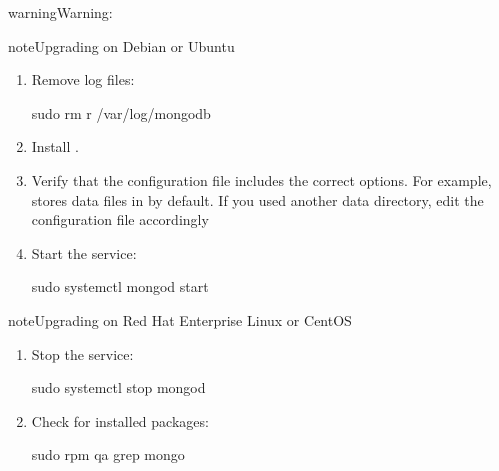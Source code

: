 \documentclass[letterpaper,10pt,english]{sphinxmanual}
\begin{document}
\begin{sphinxadmonition}{warning}{Warning:}
\begin{sphinxadmonition}{note}{Upgrading on Debian or Ubuntu}
\begin{enumerate}
\item {} 
\sphinxAtStartPar
Remove log files:

\begin{sphinxVerbatim}[commandchars=\\\{\}]
\PYGZdl{} sudo rm \PYGZhy{}r /var/log/mongodb
\end{sphinxVerbatim}

\item {} 
\sphinxAtStartPar
Install  {\hyperref[\detokenize{install/apt:apt}]{}}.

\item {} 
\sphinxAtStartPar
Verify that the configuration file includes the correct options. For example,  stores data files in  by default. If you used another  data directory, edit the configuration file accordingly

\item {} 
\sphinxAtStartPar
Start the  service:

\begin{sphinxVerbatim}[commandchars=\\\{\}]
\PYGZdl{} sudo systemctl mongod start
\end{sphinxVerbatim}

\end{enumerate}
\end{sphinxadmonition}

\begin{sphinxadmonition}{note}{Upgrading on Red Hat Enterprise Linux or CentOS}
\begin{enumerate}
%
\item {} 
\sphinxAtStartPar
Stop the  service:

\begin{sphinxVerbatim}[commandchars=\\\{\}]
\PYGZdl{} sudo systemctl stop mongod
\end{sphinxVerbatim}

\item {} 
\sphinxAtStartPar
Check for installed packages:

\begin{sphinxVerbatim}[commandchars=\\\{\}]
\PYGZdl{} sudo rpm \PYGZhy{}qa  grep mongo
\end{sphinxVerbatim}


\end{enumerate}
\end{sphinxadmonition}
\end{sphinxadmonition}
\end{document}
